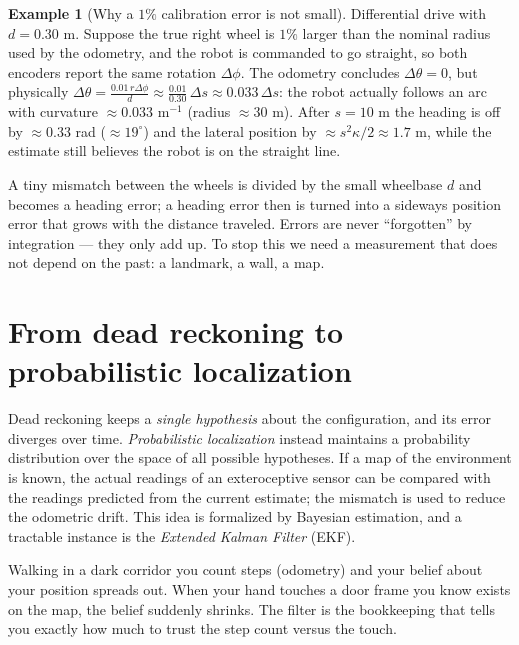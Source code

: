 \documentclass[11pt,a4paper]{article}
\newcommand{\slides}[1]{\texorpdfstring{\hspace{0.5em}{\normalfont\small\emph{(#1)}}}{}}
\theoremstyle{definition}
\newtheorem{example}[definition]{Example}
\theoremstyle{plain}
\theoremstyle{remark}
\begin{document}
\begin{example}[Why a $1\%$ calibration error is not small]
Differential drive with $d=0.30$ m. Suppose the true right wheel is $1\%$ larger than the nominal
radius used by the odometry, and the robot is commanded to go straight, so both encoders report the same
rotation $\Delta\phi$. The odometry concludes $\Delta\theta=0$, but physically
$\Delta\theta=\frac{0.01\,r\Delta\phi}{d}\approx\frac{0.01}{0.30}\,\Delta s\approx0.033\,\Delta s$:
the robot actually follows an arc with curvature $\approx0.033$ m$^{-1}$ (radius $\approx30$ m).
After $s=10$ m the heading is off by $\approx0.33$ rad ($\approx19^\circ$) and the lateral position by
$\approx s^2\kappa/2\approx1.7$ m, while the estimate still believes the robot is on the straight line.
\end{example}

\begin{intuition}
A tiny mismatch between the wheels is divided by the small wheelbase $d$ and becomes a heading error; a
heading error then is turned into a sideways position error that grows with the distance traveled. Errors
are never ``forgotten'' by integration --- they only add up. To stop this we need a measurement that
does not depend on the past: a landmark, a wall, a map.
\end{intuition}

\section{From dead reckoning to probabilistic localization \slides{EKF deck, slide 2}}

Dead reckoning keeps a \emph{single hypothesis} about the configuration, and its error diverges over time.
\emph{Probabilistic localization} instead maintains a probability distribution over the space of all possible
hypotheses. If a map of the environment is known, the actual readings of an exteroceptive sensor can be compared
with the readings predicted from the current estimate; the mismatch is used to reduce the odometric drift. This
idea is formalized by Bayesian estimation, and a tractable instance is the \emph{Extended Kalman Filter} (EKF).

\begin{intuition}
Walking in a dark corridor you count steps (odometry) and your belief about your position spreads out. When
your hand touches a door frame you know exists on the map, the belief suddenly shrinks. The filter
is the bookkeeping that tells you exactly how much to trust the step count versus the touch.
\end{intuition}
\end{document}
